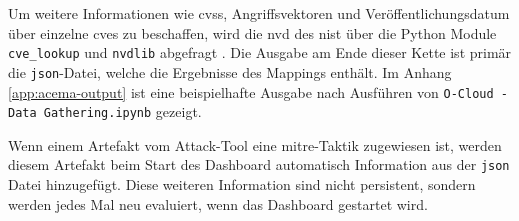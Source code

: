 \par Um weitere Informationen wie \gls{cvss}, Angriffsvektoren und Veröffentlichungsdatum über einzelne \glspl{cve} zu beschaffen, wird die \gls{nvd} des \gls{nist} über die Python Module \verb|cve_lookup| und \verb|nvdlib| abgefragt \autocite{NVDLibNVDLibNIST} \autocite{MachineThingCve_lookupLook} \autocite{NVDHome}. Die Ausgabe am Ende dieser Kette ist primär die \verb|json|-Datei, welche die Ergebnisse des Mappings enthält. Im Anhang \ref{app:acema-output} ist eine beispielhafte Ausgabe nach Ausführen von \verb|O-Cloud - Data Gathering.ipynb| gezeigt.
\par Wenn einem Artefakt vom Attack-Tool eine \gls{mitre}-Taktik zugewiesen ist, werden diesem Artefakt beim Start des Dashboard automatisch Information aus der \verb|json| Datei hinzugefügt. Diese weiteren Information sind nicht persistent, sondern werden jedes Mal neu evaluiert, wenn das Dashboard gestartet wird.

